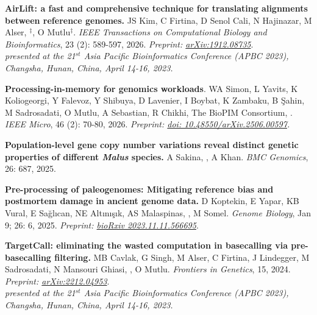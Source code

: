 \vspace{-.2cm}
    {\bf AirLift: a fast and comprehensive technique for translating alignments between reference genomes.} JS Kim, C Firtina, D Senol Cali, N Hajinazar, M Alser, \calkan{}$^\ddag$, O Mutlu$^\ddag$. {\it IEEE Transactions on Computational Biology and Bioinformatics}, 23 (2): 589-597, 2026. \textit{Preprint: \href{https://doi.org/10.48550/arXiv.1912.08735}{arXiv:1912.08735}}.\\
    \hspace*{1cm}
    {\footnotesize \em presented at the 21$^{st}$ Asia Pacific Bioinformatics Conference (APBC 2023), Changsha, Hunan, China, April 14-16, 2023.}

\vspace{-.2cm}
    {\bf Processing-in-memory for genomics workloads}. WA Simon, L Yavits, K Koliogeorgi, Y Falevoz, Y Shibuya, D Lavenier, I Boybat, K Zambaku, B Şahin, M Sadrosadati, O Mutlu, A Sebastian, R Chikhi, The BioPIM Consortium, \calkan{}. {\it IEEE Micro},  46 (2): 70-80, 2026. \textit{Preprint: \href{https://doi.org/10.48550/arXiv.2506.00597}{doi: 10.48550/arXiv.2506.00597}.}
    
\vspace{-.2cm}
    {\bf Population-level gene copy number variations reveal distinct genetic properties of different \textit{Malus} species.}  A Sakina, \calkan{}, A Khan.  {\it BMC Genomics},  26: 687, 2025. 

\vspace{-.2cm}
    {\bf Pre-processing of paleogenomes: Mitigating reference bias and postmortem damage in ancient genome data.} D Koptekin, E Yapar, KB Vural, E Sağlıcan, NE Altınışık, AS Malaspinas, \calkan{}, M Somel. {\it Genome Biology}, Jan 9; 26: 6, 2025. \textit{Preprint: \href{https://doi.org/10.1101/2023.11.11.566695}{bioRxiv 2023.11.11.566695}}.

\vspace{-.2cm}
    {\bf TargetCall: eliminating the wasted computation in basecalling via pre-basecalling filtering.} MB Cavlak, G Singh, M Alser, C Firtina, J Lindegger, M Sadrosadati, N Mansouri Ghiasi, \calkan{}, O Mutlu. {\it Frontiers in Genetics}, 15, 2024. \textit{Preprint: \href{https://doi.org/10.48550/arXiv.2212.04953}{arXiv:2212.04953}}.\\
    \hspace*{1cm}
    {\footnotesize \em presented at the 21$^{st}$ Asia Pacific Bioinformatics Conference (APBC 2023), Changsha, Hunan, China, April 14-16, 2023.}

